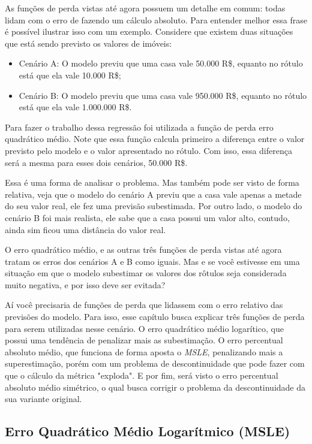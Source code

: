 As funções de perda vistas até agora possuem um detalhe em comum: todas lidam com o erro de fazendo um cálculo absoluto. Para entender melhor essa frase é possível ilustrar isso com um exemplo. Considere que existem duas situações que está sendo previsto os valores de imóveis:

\begin{itemize}
    \item Cenário A: O modelo previu que uma casa vale 50.000 R\$, equanto no rótulo está que ela vale 10.000 R\$;
    \item Cenário B: O modelo previu que uma casa vale 950.000 R\$, equanto no rótulo está que ela vale 1.000.000 R\$.
\end{itemize}

Para fazer o trabalho dessa regressão foi utilizada a função de perda erro quadrático médio. Note que essa função calcula primeiro a diferença entre o valor previsto pelo modelo e o valor apresentado no rótulo. Com isso, essa diferença será a mesma para esses dois cenários, 50.000 R\$.

Essa é uma forma de analisar o problema. Mas também pode ser visto de forma relativa, veja que o modelo do cenário A previu que a casa vale apenas a metade do seu valor real, ele fez uma previsão subestimada. Por outro lado, o modelo do cenário B foi mais realista, ele sabe que a casa possui um valor alto, contudo, ainda sim ficou uma distância do valor real. 

O erro quadrático médio, e as outras três funções de perda vistas até agora tratam os erros dos cenários A e B como iguais. Mas e se você estivesse em uma situação em que o modelo subestimar os valores dos rôtulos seja considerada muito negativa, e por isso deve ser evitada?

Aí você precisaria de funções de perda que lidassem com o erro relativo das previsões do modelo. Para isso, esse capítulo busca explicar três funções de perda para serem utilizadas nesse cenário. O erro quadrático médio logarítico, que possui uma tendência de penalizar mais as subestimação. O erro percentual absoluto médio, que funciona de forma aposta o \textit{MSLE}, penalizando mais a superestimação, porém com um problema de descontinuidade que pode fazer com que o cálculo da métrica "exploda". E por fim, será visto o erro percentual absoluto médio simétrico, o qual busca corrigir o problema da descontinuidade da sua variante original.

\subsection{Erro Quadrático Médio Logarítmico (MSLE)}

